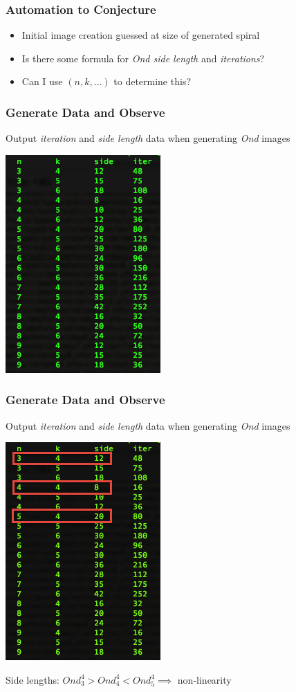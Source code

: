 \documentclass{beamer}
\theoremstyle{mydef}
\begin{document}
\frame
{
  \frametitle{Automation to Conjecture}
  
  \begin{itemize}
  \item Initial image creation guessed at size of generated spiral
  \item Is there some formula for \emph{Ond side length} and \emph{iterations}?
  \item Can I use $(n, k, \ldots)$ to determine this?
  \end{itemize}

}

\frame
{
 \frametitle{Generate Data and Observe}
  Output \emph{iteration} and \emph{side length} data when generating \emph{Ond} images
\begin{center}
\includegraphics[scale=.5]{images/sometab.png}

\end{center}
}

\frame
{
 \frametitle{Generate Data and Observe}
  Output \emph{iteration} and \emph{side length} data when generating \emph{Ond} images
  
\begin{center}
\includegraphics[scale=.5]{images/sometab-box.png}

  Side lengths:  $Ond_3^{4} > Ond_4^{4} < Ond_5^{4}  \implies$ non-linearity
\end{center}
}
\end{document}
